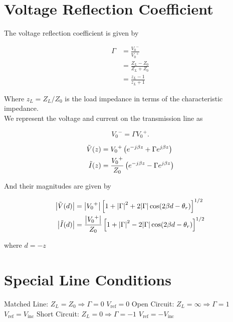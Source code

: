 \documentclass{report}
\begin{document}
\section{Voltage Reflection Coefficient}

The voltage reflection coefficient is given by

\begin{align*}
	\Gamma & = \frac{{V_0}^-}{{V_0}^+}     \\
	       & = \frac{Z_L - Z_0}{Z_L + Z_0} \\
	       & = \frac{z_L -1}{z_L + 1}
\end{align*}

Where $z_L = Z_L/Z_0$ is the load impedance in terms of the characteristic impedance.\\

We represent the voltage and current on the transmission line as

\[
	{V_0}^- = \Gamma {V_0}^+
	.\]

\begin{align*}
	\tilde{V}(z) & = {V_0}^+ \left( e^{-j\beta z} + \Gamma e^{j\beta z} \right)             \\
	\tilde{I}(z) & = \frac{{V_0}^+}{Z_0} \left( e^{-j\beta z} - \Gamma e^{j\beta z} \right)
\end{align*}

And their magnitudes are given by

\begin{align*}
	\abs{\tilde{V}(d)} & = \abs{{V_0}^+} \left[ 1 + \abs{\Gamma}^2 + 2 \abs{\Gamma} \cos(2\beta d - \theta_r) \right]^{1/2}             \\
	\abs{\tilde{I}(d)} & = \frac{\abs{{V_0}^+}}{Z_0} \left[ 1 + \abs{\Gamma}^2 - 2 \abs{\Gamma} \cos(2\beta d - \theta_r) \right]^{1/2}
\end{align*}

where $d=-z$

\section{Special Line Conditions}

\begin{enumerate}
	\ii Matched Line: $Z_L = Z_0 \Rightarrow \Gamma = 0$ $V_\text{ref} = 0$
	\ii Open Circuit: $Z_L = \infty \Rightarrow \Gamma = 1$ $V_\text{ref} = V_\text{inc}$
	\ii Short Circuit: $Z_L = 0 \Rightarrow \Gamma = -1$ $V_\text{ref} = -V_\text{inc}$
\end{enumerate}
\end{document}
